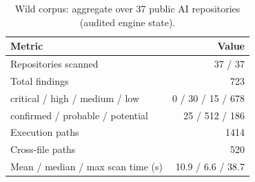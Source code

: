 \begin{table}[t]\centering\caption{Wild corpus: aggregate over 37 public AI repositories (audited engine state).}\label{tab:wild}
\begin{tabular}{lr}\toprule Metric & Value \\\midrule
Repositories scanned & 37 / 37 \\
Total findings & 723 \\
\quad critical / high / medium / low & 0 / 30 / 15 / 678 \\
\quad confirmed / probable / potential & 25 / 512 / 186 \\
Execution paths & 1414 \\
Cross-file paths & 520 \\
Mean / median / max scan time (s) & 10.9 / 6.6 / 38.7 \\
\bottomrule\end{tabular}\end{table}
